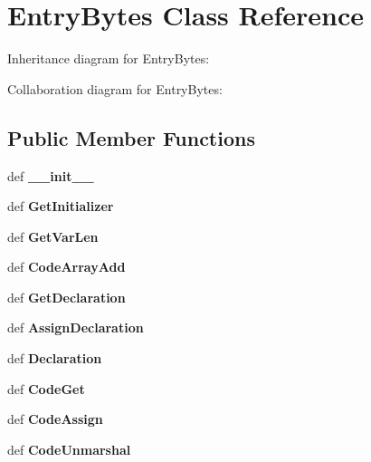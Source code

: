 \section{\-Entry\-Bytes \-Class \-Reference}
\label{classevent__rpcgen_1_1_entry_bytes}


\-Inheritance diagram for \-Entry\-Bytes\-:


\-Collaboration diagram for \-Entry\-Bytes\-:
\subsection*{\-Public \-Member \-Functions}
\begin{DoxyCompactItemize}
\item 
def {\bfseries \-\_\-\-\_\-init\-\_\-\-\_\-}\label{classevent__rpcgen_1_1_entry_bytes_ac775ee34451fdfa742b318538164070e}

\item 
def {\bfseries \-Get\-Initializer}\label{classevent__rpcgen_1_1_entry_bytes_acc967744885bfbdf0f0aeed27c888d23}

\item 
def {\bfseries \-Get\-Var\-Len}\label{classevent__rpcgen_1_1_entry_bytes_a08d14096a163fb84ee8c3536eab2ff47}

\item 
def {\bfseries \-Code\-Array\-Add}\label{classevent__rpcgen_1_1_entry_bytes_a1f454357f69d9ec15f1a68c95d0e0326}

\item 
def {\bfseries \-Get\-Declaration}\label{classevent__rpcgen_1_1_entry_bytes_a466f7ed549f8de6974add96c9ebf1d09}

\item 
def {\bfseries \-Assign\-Declaration}\label{classevent__rpcgen_1_1_entry_bytes_a415190be3c5f4dde7128f492d38a2196}

\item 
def {\bfseries \-Declaration}\label{classevent__rpcgen_1_1_entry_bytes_a564a165c99a4874ce9135fc27e62cebc}

\item 
def {\bfseries \-Code\-Get}\label{classevent__rpcgen_1_1_entry_bytes_ac4f27f4fd487ba8b17807758ea0b5234}

\item 
def {\bfseries \-Code\-Assign}\label{classevent__rpcgen_1_1_entry_bytes_a6b6a08cd00ffadb276d29fcbf0dc3bfc}

\item 
def {\bfseries \-Code\-Unmarshal}\label{classevent__rpcgen_1_1_entry_bytes_a4f7edbd130c034cfa9d24b7be679f8af}


\end{DoxyCompactItemize}
